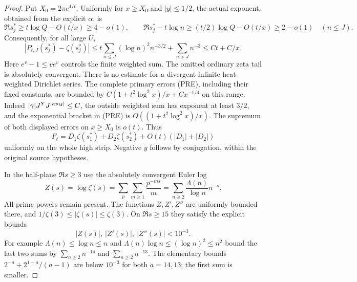 \documentclass[11pt]{article}
\theoremstyle{remark}\newtheorem{remark}[theorem]{Remark}
\begin{document}
\begin{proof}
Put $X_0=2\pi e^{4/t}$. Uniformly for $x\ge X_0$ and
$|y|\le1/2$, the actual exponent, obtained from the explicit $\alpha$, is
\[
 \Re s_j^*\ge t\log Q-O(t/x)\ge4-o(1),\qquad
 \Re s_j^*-t\log n\ge(t/2)\log Q-O(t/x)
                    \ge2-o(1)\quad(n\le J).          \tag{PW6}
\]
Consequently, for all large $U$,
\[
 |P_{t,J}(s_j^*)-\zeta(s_j^*)|
 \le t\sum_{n\le J}(\log n)^2n^{-3/2}
       +\sum_{n>J}n^{-3}
 \le Ct+C/x.                                        \tag{PW7}
\]
Here $e^v-1\le ve^v$ controls the finite weighted sum. The omitted
ordinary zeta tail is absolutely convergent. There is no estimate for
a divergent infinite heat-weighted Dirichlet series.
The complete primary errors (PRE), including their fixed constants,
are bounded by
$C(1+t^2\log^2x)/x+Cx^{-1/4}$ on this range. Indeed
$|\gamma|J^YJ^{|\kappa_{\rm PM}|}\le C$, the outside weighted sum
has exponent at least $3/2$, and the exponential bracket in (PRE)
is $O((1+t^2\log^2x)/x)$. The supremum of both displayed errors
on $x\ge X_0$ is $o(t)$. Thus
\[
 F_t=D_1\zeta(s_1^*)+D_2\zeta(s_2^*)
              +O(t)(|D_1|+|D_2|)                    \tag{PW8}
\]
uniformly on the whole high strip. Negative $y$ follows by conjugation,
within the original source hypotheses.

In the half-plane $\Re s\ge3$ use the absolutely convergent Euler log
\[
 Z(s)=\log\zeta(s)
     =\sum_p\sum_{m\ge1}\frac{p^{-ms}}m
     =\sum_{n\ge2}\frac{\Lambda(n)}{\log n}n^{-s}.   \tag{PW9}
\]
All prime powers remain present. The functions $Z,Z',Z''$ are uniformly
bounded there, and $1/\zeta(3)\le|\zeta(s)|\le\zeta(3)$.
On $\Re s\ge15$ they satisfy the explicit bounds
\[
 |Z(s)|,\ |Z'(s)|,\ |Z''(s)|<10^{-3}.              \tag{PW10}
\]
For example $\Lambda(n)\le\log n\le n$ and
$\Lambda(n)\log n\le(\log n)^2\le n^2$ bound the last two sums
by $\sum_{n\ge2}n^{-14}$ and $\sum_{n\ge2}n^{-13}$.
The elementary bounds $2^{-a}+2^{1-a}/(a-1)$ are below $10^{-3}$
for both $a=14,13$; the first sum is smaller.


\end{proof}
\end{document}
